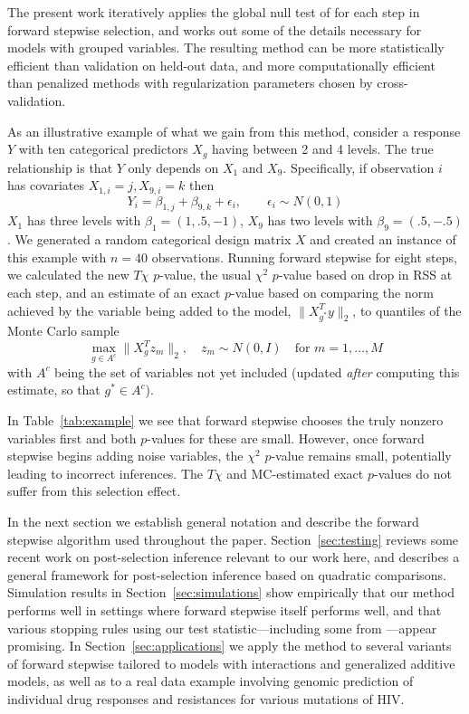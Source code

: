 \documentclass{imsart}
\begin{document}
The present work iteratively applies the global null test
of \cite{tests:adaptive} for each step in forward stepwise selection,
and works out some of the details necessary for
models with grouped variables. The resulting method can
be more statistically efficient than validation on held-out data, and
more computationally efficient than penalized methods with
regularization parameters chosen by cross-validation.

As an illustrative example of what we gain from this method,
consider a response $Y$ with ten
categorical predictors $X_g$ having between 2 and 4 levels. The true 
relationship is that $Y$ only depends on $X_1$ and $X_9$. Specifically,
if observation $i$ has covariates $X_{1,i} = j, X_{9,i} = k$ then
\[
    Y_i = \beta_{1,j} + \beta_{9,k} + \epsilon_i , \qquad
    \epsilon_i \sim N(0,1)
\]
$X_1$ has three levels with $\beta_1 = (1, .5, -1)$, $X_9$
has two levels with $\beta_9 = (.5, -.5)$. We generated a random
categorical design matrix $X$ and created an instance of this example
with $n = 40$ observations. Running forward stepwise for eight steps,
we calculated the new $T\chi$ $p$-value, the usual
$\chi^2$ $p$-value based on drop in RSS at each step,
and an estimate of an exact $p$-value based on comparing the norm
achieved by the variable being added to the model, $\| X_{g^*}^T y \|_2$,
to quantiles of the Monte Carlo sample
\[
\max_{g \in A^c} \| X_g^T z_m \|_2, \quad z_m \sim N(0, I) \quad \text{for } m = 1,\ldots,M
\]
with $A^c$ being the set of variables not yet included
(updated \textit{after} computing this estimate, so that $g^* \in A^c$).



In Table~\ref{tab:example} we see that forward stepwise chooses the
truly nonzero variables first and both $p$-values for these are small.
However, once forward stepwise begins adding noise variables, the
$\chi^2$ $p$-value remains small, potentially leading to 
incorrect inferences. The $T\chi$ and MC-estimated exact $p$-values
do not suffer from this selection effect.

In the next section we establish general notation and describe the
forward stepwise algorithm used throughout the paper.
Section~\ref{sec:testing} reviews some recent work on
post-selection inference
\citep{significance:lasso,tests:adaptive,lasso:fixed}
relevant to our work here, and describes a general framework
for post-selection inference based on quadratic comparisons.
Simulation results in Section~\ref{sec:simulations} show
empirically that our method performs well in settings where forward
stepwise itself performs well, and that
various stopping rules using our test statistic---including
some from \cite{sequential:fdr}---appear promising. In
Section~\ref{sec:applications} we apply
the method to several variants of forward
stepwise tailored to models with interactions and generalized additive
models, as well as to a real data example involving genomic prediction
of individual drug responses and resistances for various mutations of HIV.
\end{document}
